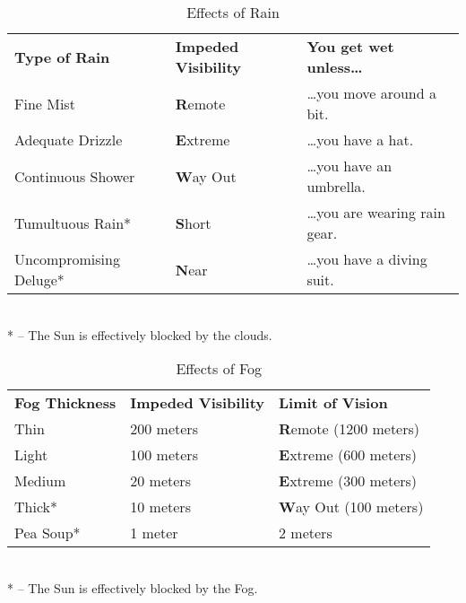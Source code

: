 \begin{table}[htb]
 \caption{Effects of Rain} \centering
\begin{tabular}{l l l}
\textbf{Type of Rain} & \textbf{Impeded Visibility} & \textbf{You get wet unless\ldots{}}\\
Fine Mist & \textbf{R}emote &\ldots{}you move around a bit.\\
Adequate Drizzle& \textbf{E}xtreme&\ldots{}you have a hat.\\
Continuous Shower & \textbf{W}ay Out&\ldots{}you have an umbrella.\\
Tumultuous Rain* & \textbf{S}hort&\ldots{}you are wearing rain gear.\\
Uncompromising Deluge* & \textbf{N}ear&\ldots{}you have a diving suit.\\
\end{tabular}\\
* -- The Sun is effectively blocked by the clouds.
\end{table}
\begin{table}[htb] 
\caption{Effects of Fog} \centering
\begin{tabular}{l l l}
\textbf{Fog Thickness}&\textbf{Impeded Visibility}&\textbf{Limit of Vision}\\
Thin&200 meters&\textbf{R}emote (1200 meters)\\
Light&100 meters&\textbf{E}xtreme (600 meters)\\
Medium&20 meters&\textbf{E}xtreme (300 meters)\\
Thick*&10 meters&\textbf{W}ay Out (100 meters)\\
Pea Soup*&1 meter&2 meters\\
\end{tabular}\\
* -- The Sun is effectively blocked by the Fog.
\end{table}

